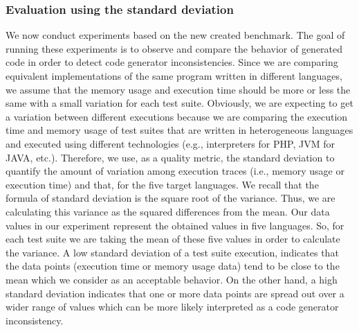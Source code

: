 \subsubsection{Evaluation using the standard deviation}
We now conduct experiments based on the new created benchmark. 
The goal of running these experiments is to observe and compare the behavior of generated code in order to detect code generator inconsistencies.
Since we are comparing equivalent implementations of the same program written in different languages, we assume that the memory usage and execution time should be more or less the same with a small variation for each test suite. Obviously, we are expecting to get a variation between different executions because we are comparing the execution time and memory usage of test suites that are written in heterogeneous languages and executed using different technologies (e.g., interpreters for PHP, JVM for JAVA, etc.). 
Therefore, we use, as a quality metric, the standard deviation to quantify the amount of variation among execution traces (i.e., memory usage or execution time) and that, for the five target languages. We recall that the formula of standard deviation is the square root of the variance. Thus, we are calculating this variance as the squared differences from the mean. Our data values in our experiment represent the obtained values in five languages. So, for each test suite we are taking the mean of these five values in order to calculate the variance.
A low standard deviation of a test suite execution, indicates that the data points (execution time or memory usage data) tend to be close to the mean which we consider as an acceptable behavior.  
On the other hand, a high standard deviation indicates that one or more data points are spread out over a wider range of values which can be more likely interpreted as a code generator inconsistency. 

